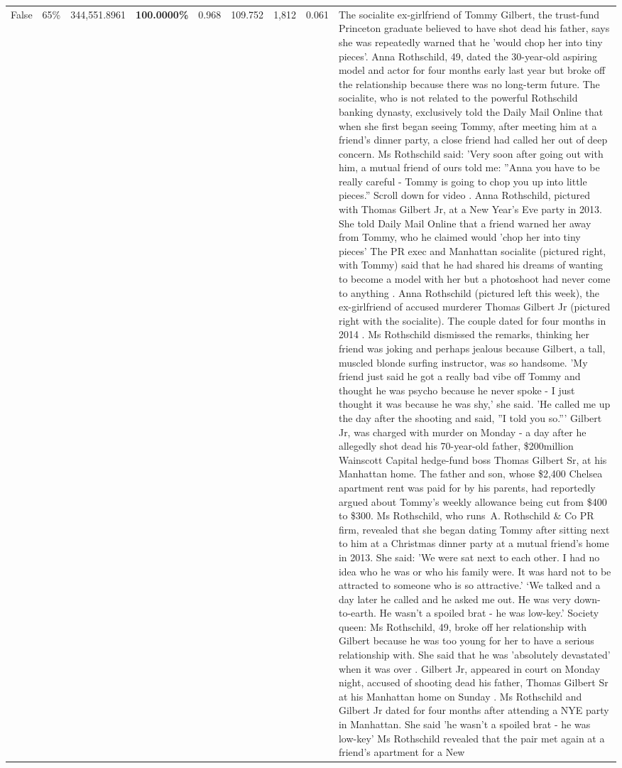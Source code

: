 \begin{table}[H]
\begin{tabular}{lllrlllll}
False & 65\% & 344,551.8961 & \bfseries \color{red} 100.0000\% & 0.968 & 109.752 & 1,812 & 0.061 & The socialite ex-girlfriend of Tommy Gilbert, the trust-fund Princeton graduate believed to have shot dead his father, says she was repeatedly warned that he 'would chop her into tiny pieces'. Anna Rothschild, 49, dated the 30-year-old aspiring model and actor for four months early last year but broke off the relationship because there was no long-term future. The socialite, who is not related to the powerful Rothschild banking dynasty, exclusively told the Daily Mail Online that when she first began seeing Tommy, after meeting him at a friend's dinner party, a close friend had called her out of deep concern. Ms Rothschild said: 'Very soon after going out with him, a mutual friend of ours told me: ''Anna you have to be really careful - Tommy is going to chop you up into little pieces.'' Scroll down for video . Anna Rothschild, pictured with Thomas Gilbert Jr, at a New Year's Eve party in 2013. She told Daily Mail Online that a friend warned her away from Tommy, who he claimed would 'chop her into tiny pieces' The PR exec and Manhattan socialite (pictured right, with Tommy) said that he had shared his dreams of wanting to become a model with her but a photoshoot had never come to anything . Anna Rothschild (pictured left this week), the ex-girlfriend of accused murderer Thomas Gilbert Jr (pictured right with the socialite). The couple dated for four months in 2014 . Ms Rothschild dismissed the remarks, thinking her friend was joking and perhaps jealous because Gilbert, a tall, muscled blonde surfing instructor, was so handsome. 'My friend just said he got a really bad vibe off Tommy and thought he was psycho because he never spoke - I just thought it was because he was shy,' she said. 'He called me up the day after the shooting and said, ''I told you so.''' Gilbert Jr, was charged with murder on Monday - a day after he allegedly shot dead his 70-year-old father, \$200million Wainscott Capital hedge-fund boss Thomas Gilbert Sr, at his Manhattan home. The father and son, whose \$2,400 Chelsea apartment rent was paid for by his parents, had reportedly argued about Tommy's weekly allowance being cut from \$400 to \$300. Ms Rothschild, who runs A. Rothschild \& Co PR firm, revealed that she began dating Tommy after sitting next to him at a Christmas dinner party at a mutual friend's home in 2013. She said: 'We were sat next to each other. I had no idea who he was or who his family were. It was hard not to be attracted to someone who is so attractive.' ‘We talked and a day later he called and he asked me out. He was very down-to-earth. He wasn’t a spoiled brat - he was low-key.’ Society queen: Ms Rothschild, 49, broke off her relationship with Gilbert because he was too young for her to have a serious relationship with. She said that he was 'absolutely devastated' when it was over . Gilbert Jr, appeared in court on Monday night, accused of shooting dead his father, Thomas Gilbert Sr at his Manhattan home on Sunday . Ms Rothschild and Gilbert Jr dated for four months after attending a NYE party in Manhattan. She said 'he wasn't a spoiled brat - he was low-key' Ms Rothschild revealed that the pair met again at a friend’s apartment for a New 
\end{tabular}
\end{table}

